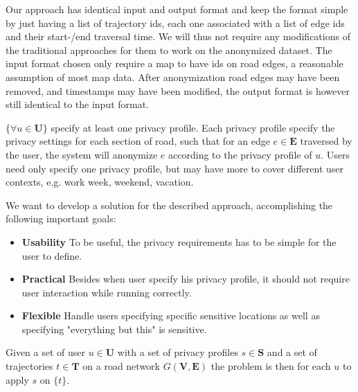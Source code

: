 Our approach has identical input and output format and keep the format simple by just having a list of trajectory ids, each one associated with a list of edge ids and their start-/end traversal time. We will thus not require any modifications of the traditional approaches for them to work on the anonymized dataset. The input format chosen only require a map to have ids on road edges, a reasonable assumption of most map data.
After anonymization road edges may have been removed, and timestamps may have been modified, the output format is however still identical to the input format.

$\{\forall u \in \mathbf{U}\}$ specify at least one privacy profile. Each privacy profile specify the privacy settings for each section of road, such that for an edge  $e \in \mathbf{E}$ traversed by the user, the system will anonymize $e$ according to the privacy profile of $u$. Users need only specify one privacy profile, but may have more to cover different user contexts, e.g. work week, weekend, vacation.


We want to develop a solution for the described approach, accomplishing the following important goals:
\begin{itemize}
	\item {\bf Usability }
		To be useful, the privacy requirements has to be simple for the user to define.
	\item {\bf Practical }
		Besides when user specify his privacy profile, it should not require user interaction while running correctly.
	\item {\bf Flexible }
		Handle users specifying specific sensitive locations as well as specifying "everything but this" is sensitive.
\end{itemize}



Given a set of user $u \in \mathbf{U}$ with a set of privacy profiles $s \in \mathbf{S}$ and a set of trajectories $t \in \mathbf{T}$ on a road network $G(\mathbf{V,E})$ the problem is then for each $u$ to apply $s$ on $\{t\}$.



